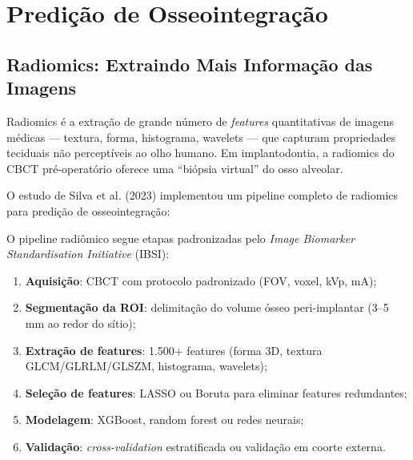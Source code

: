 \section{Predição de Osseointegração}

\subsection{Radiomics: Extraindo Mais Informação das Imagens}

Radiomics é a extração de grande número de \textit{features} quantitativas de imagens médicas --- textura, forma, histograma, wavelets --- que capturam propriedades teciduais não perceptíveis ao olho humano. Em implantodontia, a radiomics do CBCT pré-operatório oferece uma ``biópsia virtual'' do osso alveolar.

O estudo de Silva et al. (2023) implementou um pipeline completo de radiomics para predição de osseointegração:


O pipeline radiômico segue etapas padronizadas pelo \textit{Image Biomarker Standardisation Initiative} (IBSI):
\begin{enumerate}
    \item \textbf{Aquisição}: CBCT com protocolo padronizado (FOV, voxel, kVp, mA);
    \item \textbf{Segmentação da ROI}: delimitação do volume ósseo peri-implantar (3--5 mm ao redor do sítio);
    \item \textbf{Extração de features}: 1.500+ features (forma 3D, textura GLCM/GLRLM/GLSZM, histograma, wavelets);
    \item \textbf{Seleção de features}: LASSO ou Boruta para eliminar features redundantes;
    \item \textbf{Modelagem}: XGBoost, random forest ou redes neurais;
    \item \textbf{Validação}: \textit{cross-validation} estratificada ou validação em coorte externa.
\end{enumerate}

